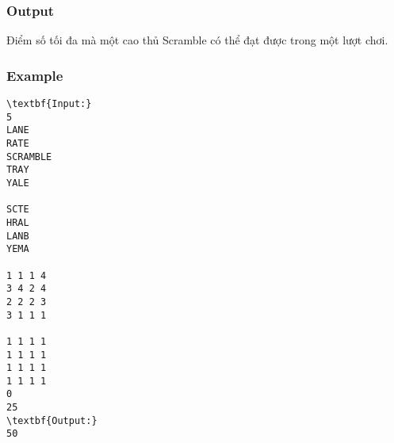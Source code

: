 \subsubsection{Output}

Điểm số tối đa mà một cao thủ Scramble có thể đạt được trong một lượt chơi.

\subsubsection{Example}
\begin{verbatim}
\textbf{Input:}
5
LANE
RATE
SCRAMBLE
TRAY
YALE

SCTE
HRAL
LANB
YEMA

1 1 1 4
3 4 2 4
2 2 2 3
3 1 1 1

1 1 1 1
1 1 1 1
1 1 1 1
1 1 1 1
0
25
\textbf{Output:}
50
\end{verbatim}